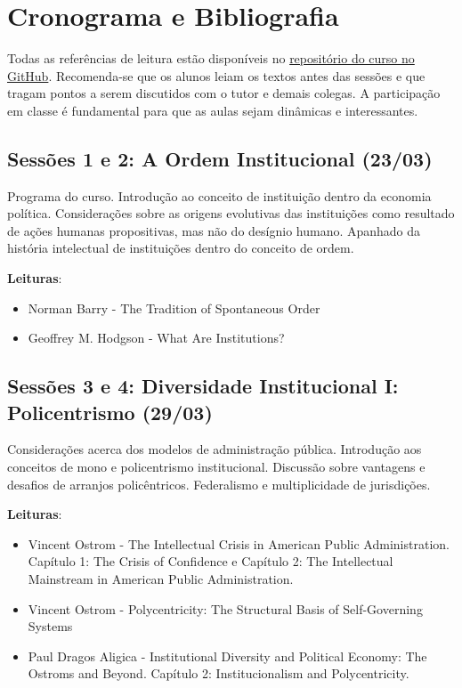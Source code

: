 \documentclass[12pt,]{article}
\providecommand{\tightlist}{%
  \setlength{\itemsep}{0pt}\setlength{\parskip}{0pt}}
\begin{document}
\newpage

\section{Cronograma e Bibliografia}\label{cronograma-e-bibliografia}

Todas as referências de leitura estão disponíveis no
\href{http://github.com/danilofreire/eei-omma-ufm}{repositório do curso
no GitHub}. Recomenda-se que os alunos leiam os textos antes das sessões
e que tragam pontos a serem discutidos com o tutor e demais colegas. A
participação em classe é fundamental para que as aulas sejam dinâmicas e
interessantes.

\subsection{Sessões 1 e 2: A Ordem Institucional
(23/03)}\label{sessoes-1-e-2-a-ordem-institucional-2303}

Programa do curso. Introdução ao conceito de instituição dentro da
economia política. Considerações sobre as origens evolutivas das
instituições como resultado de ações humanas propositivas, mas não do
desígnio humano. Apanhado da história intelectual de instituições dentro
do conceito de ordem.

\textbf{Leituras}:

\begin{itemize}
\tightlist
\item
  Norman Barry - The Tradition of Spontaneous Order
\item
  Geoffrey M. Hodgson - What Are Institutions?
\end{itemize}

\subsection{Sessões 3 e 4: Diversidade Institucional I: Policentrismo
(29/03)}\label{sessoes-3-e-4-diversidade-institucional-i-policentrismo-2903}

Considerações acerca dos modelos de administração pública. Introdução
aos conceitos de mono e policentrismo institucional. Discussão sobre
vantagens e desafios de arranjos policêntricos. Federalismo e
multiplicidade de jurisdições.

\textbf{Leituras}:

\begin{itemize}
\tightlist
\item
  Vincent Ostrom - The Intellectual Crisis in American Public
  Administration. Capítulo 1: The Crisis of Confidence e Capítulo 2: The
  Intellectual Mainstream in American Public Administration.
\item
  Vincent Ostrom - Polycentricity: The Structural Basis of
  Self-Governing Systems
\item
  Paul Dragos Aligica - Institutional Diversity and Political Economy:
  The Ostroms and Beyond. Capítulo 2: Institucionalism and
  Polycentricity.
\end{itemize}
\end{document}

